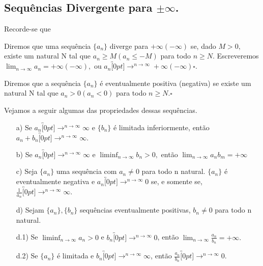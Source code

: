 \documentclass[analysis_notes.tex]{subfiles}
\begin{document}
\subsection{Sequ\^encias Divergente para $\pm\infty$.}
Recorde-se que
\begin{def*}
	Diremos que uma sequ\^encia $\{a_{n}\}$ diverge para $+\infty(-\infty)$ se, dado $M >0,$ existe um natural N tal que $a_{n}\geq{M}(a_{n}\leq{-M})$
	para todo $n\geq{N}.$ Escreveremos $\lim_{n\to\infty}a_{n} = +\infty(-\infty),$ ou $a_{n}\overbracket[0pt]{\longrightarrow}^{n\to \infty}+\infty(-\infty)\square.$
\end{def*}
\begin{def*}
	Diremos que a sequ\^encia $\{a_{n}\}$ \'e eventualmente positiva (negativa) se existe um natural N tal que $a_{n} > 0 (a_{n} < 0)$
	para todo $n\geq{N}.\square$
\end{def*}
Vejamos a seguir algumas das propriedades dessas sequ\^encias.
\begin{theorem*}
	\begin{itemize}
		\item[a)] Se $a_{n}\overbracket[0pt]{\longrightarrow}^{n\to \infty}\infty$ e $\{b_{n}\}$ \'e limitada inferiormente, ent\~ao
		      $a_{n}+b_{n}\overbracket[0pt]{\longrightarrow}^{n\to \infty}\infty.$
		\item[b)] Se $a_{n}\overbracket[0pt]{\longrightarrow}^{n\to \infty}\infty$ e $\liminf_{n\to\infty}b_{n} > 0,$ ent\~ao
		      $\lim_{n\to\infty}a_{n}b_{m} = +\infty$
		\item[c)] Seja $\{a_{n}\}$ uma sequ\^encia com $a_{n}\neq0$ para todo n natural. $\{a_{n}\}$ \'e eventualmente negativa e
		      $a_{n}\overbracket[0pt]{\longrightarrow}^{n\to \infty}0$ se, e somente se, $\displaystyle \frac{1}{a_{n}}\overbracket[0pt]{\longrightarrow}^{n\to \infty}\infty.$
		\item[d)] Sejam $\{a_{n}\},\{b_{n}\} $ sequ\^encias eventualmente positivas, $b_{n}\neq 0$ para todo n natural.
		\item[d.1)]Se $\liminf_{n\to\infty}a_{n} > 0$ e $b_{n}\overbracket[0pt]{\longrightarrow}^{n\to \infty}0$, ent\~ao $\displaystyle\lim_{n\to\infty}\frac{a_{n}}{b_{n}} = +\infty.$
		\item[d.2)] Se $\{a_{n}\}$ \'e limitada e $b_{n}\overbracket[0pt]{\longrightarrow}^{n\to \infty}\infty$, ent\~ao $\displaystyle \frac{a_{n}}{b_{n}}\overbracket[0pt]{\longrightarrow}^{n\to \infty}0.$
	\end{itemize}
\end{theorem*}
\end{document}
